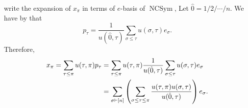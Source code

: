\documentclass[12pt]{amsart}  %
\theoremstyle{definition}
\newtheorem{proposition}[theorem]{Proposition}
\theoremstyle{remark}
\numberwithin{equation}{section}
\newcommand{\NCSym}{\ensuremath{\operatorname{NCSym}}}
\newcommand{\enc}{{e}}         	%
\newcommand{\pnc}{{p}}                %
\newcommand{\xnc}{{x}}                 %
\newcommand{\mymu}{{u}}
\newcommand\svw[1]{{\color{black}{#1}}}
\begin{document}
%
%
%
%
%
%


\svw{Finally, we} write the expansion of $\xnc_\pi$ in terms of \svw{the} $e$-basis of $\NCSym$, \svw{which leads us to a conjecture.} Let $\hat{0}=1/2/\cdots/n$. We have by \cite[Theorem 3.4]{RS} that 
$$
p_\tau=\frac{1}{\mymu(\hat{0},\tau)}\sum_{\sigma\leq \tau} u(\sigma,\tau)e_\sigma.
$$
Therefore, \svw{by definition}
\begin{equation*}
\begin{split}
x_\pi=\sum_{\tau\leq \pi} \mymu(\tau,\pi) p_\tau&=\sum_{\tau\leq \pi} \mymu(\tau,\pi)\frac{1}{\mymu(\hat{0},\tau)}\sum_{\sigma\leq \tau} \mymu(\sigma,\tau)e_{\sigma}\\
&=\sum_{\sigma\vdash [n]}\left( \sum_{\sigma\leq \tau \leq \pi}\frac{\mymu(\tau,\pi)\mymu(\sigma,\tau)}{\mymu(\hat{0},\tau)}  \right) \svw{e_\sigma.} \\
\end{split}
\end{equation*}

%
%
%
\end{document}

